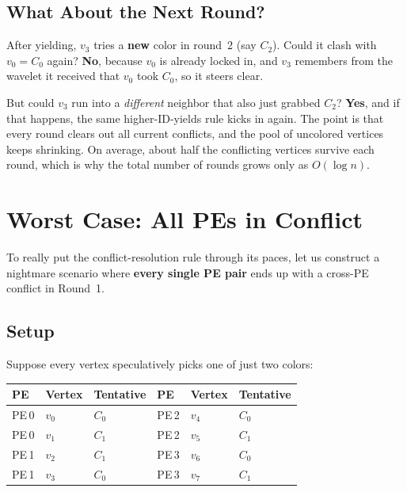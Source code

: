 \documentclass[11pt,letterpaper]{article}
\begin{document}
\subsection{What About the Next Round?}

After yielding, $v_3$ tries a \textbf{new} color in round~2 (say $C_2$). Could it clash with $v_0{=}C_0$ again? \textbf{No}, because $v_0$ is already locked in, and $v_3$ remembers from the wavelet it received that $v_0$ took $C_0$, so it steers clear.

But could $v_3$ run into a \emph{different} neighbor that also just grabbed $C_2$? \textbf{Yes}, and if that happens, the same higher-ID-yields rule kicks in again. The point is that every round clears out all current conflicts, and the pool of uncolored vertices keeps shrinking. On average, about half the conflicting vertices survive each round, which is why the total number of rounds grows only as $O(\log n)$.

\section{Worst Case: All PEs in Conflict}
\label{sec:worstcase}

To really put the conflict-resolution rule through its paces, let us construct a nightmare scenario where \textbf{every single PE pair} ends up with a cross-PE conflict in Round~1.

\subsection{Setup}

Suppose every vertex speculatively picks one of just two colors:

\begin{center}
\begin{tabular}{llll}
\toprule
PE & Vertex & Tentative & PE & Vertex & Tentative \\
\midrule
PE\,0 & $v_0$ & $C_0$ & PE\,2 & $v_4$ & $C_0$ \\
PE\,0 & $v_1$ & $C_1$ & PE\,2 & $v_5$ & $C_1$ \\
PE\,1 & $v_2$ & $C_1$ & PE\,3 & $v_6$ & $C_0$ \\
PE\,1 & $v_3$ & $C_0$ & PE\,3 & $v_7$ & $C_1$ \\
\bottomrule
\end{tabular}
\end{center}
\end{document}
